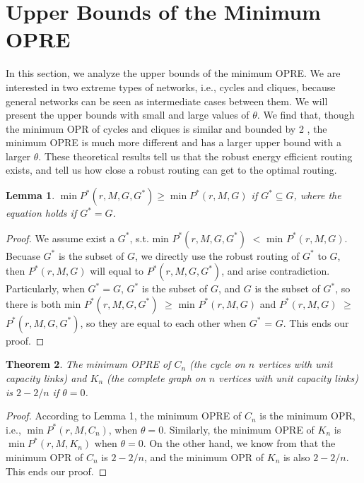 \documentclass[conference]{IEEEtran}
\newtheorem{theorem}{Theorem}
\newtheorem{lemma}[theorem]{Lemma}
\begin{document}
\section{Upper Bounds of the Minimum OPRE}

In this section, we analyze the upper bounds of the minimum OPRE. We are interested in two extreme types of networks, i.e., cycles and cliques, because general networks can be seen as intermediate cases between them. We will present the upper bounds with small and large values of $\theta$. We find that, though the minimum OPR of cycles and cliques is similar and bounded by 2 \cite{networking:oblivious}, the minimum OPRE is much more different and has a larger upper bound with a larger $\theta$. These theoretical results tell us that the robust energy efficient routing exists, and tell us how close a robust routing can get to the optimal routing.

\begin{lemma}
$\min P^*(r, M, G, G^*) \geq \min P^*(r, M, G)$ if $G^* \subseteq G$, where the equation holds if $G^* = G$.
\end{lemma}
\begin{proof}
We assume exist a $G^*$, s.t. min $P^*(r,M,G,G^*)$ $<$ min $P^*(r, M, G)$. Becuase $G^*$ is the subset of $G$, we directly
use the robust routing of $G^*$ to $G$, then $P^*(r, M, G)$ will equal to $P^*(r,M,G,G^*)$, and arise contradiction.
Particularly, when $G^* = G$, $G^*$ is the subset of $G$, and $G$ is the subset of $G^*$, so there is both 
min $P^*(r,M,G,G^*)$ $\geq$ min $P^*(r, M, G)$ and $P^*(r, M ,G)$ $\geq$ $P^*(r, M, G, G^*)$, so they are equal to each other 
when $G^*$ = $G$. This ends our proof.
\end{proof}

\begin{theorem}
The minimum OPRE of $C_n$ (the cycle on $n$ vertices with unit capacity links) and $K_n$ (the complete graph on $n$ vertices with unit capacity links) is $2-2/n$ if $\theta = 0$.
\end{theorem}
\begin{proof}
According to Lemma 1, the minimum OPRE of $C_n$ is the minimum OPR, i.e., $\min P^*(r, M, C_n)$, when $\theta = 0$. Similarly, the minimum OPRE of $K_n$ is $\min P^*(r, M, K_n)$ when $\theta = 0$. On the other hand, we know from \cite{networking:oblivious} that the minimum OPR of $C_n$ is $2-2/n$, and the minimum OPR of $K_n$ is also $2-2/n$. This ends our proof.
\end{proof}
\end{document}
